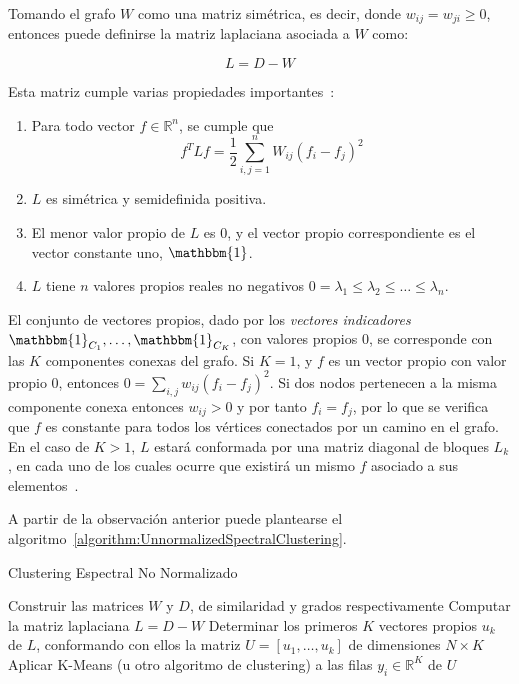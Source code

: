 Tomando el grafo $W$ como una matriz simétrica, es decir, donde $w_{ij}=w_{ji}\geq 0$, entonces puede definirse la matriz laplaciana asociada a $W$ como:

\begin{equation}
    \label{eq:laplacian-graph}
    L = D - W
\end{equation}

Esta matriz cumple varias propiedades importantes~\cite{Luxburg07}:

\begin{enumerate}
    \item Para todo vector $f\in \mathbb{R}^n$, se cumple que
    \[
        f^T Lf = \frac{1}{2}\sum_{i,j=1}^{n}{W_{ij}(f_i - f_j)^2}
    \]
    \item $L$ es simétrica y semidefinida positiva.
    \item El menor valor propio de $L$ es 0, y el vector propio correspondiente es el vector constante uno, $\mathbbm{1}$.
    \item $L$ tiene $n$ valores propios reales no negativos $0=\lambda_1 \leq \lambda_2 \leq \dots \leq \lambda_n$.
\end{enumerate}

El conjunto de vectores propios, dado por los \textit{vectores indicadores} $\mathbbm{1}_{C_1}, \dots, \mathbbm{1}_{C_K}$, con valores propios 0, se corresponde con las $K$ componentes conexas del grafo.
Si $K=1$, y $f$ es un vector propio con valor propio 0, entonces $0=\sum_{i,j}{w_{ij}(f_i - f_j)^2}$.
Si dos nodos pertenecen a la misma componente conexa entonces $w_{ij}>0$ y por tanto $f_i = f_j$, por lo que se verifica que $f$ es constante para todos los vértices conectados por un camino en el grafo.
En el caso de $K>1$, $L$ estará conformada por una matriz diagonal de bloques $L_k$, en cada uno de los cuales ocurre que existirá un mismo $f$ asociado a sus elementos~\cite{Luxburg07,Murphy12}.

A partir de la observación anterior puede plantearse el algoritmo~\ref{algorithm:UnnormalizedSpectralClustering}.

\begin{algorithm}
    \caption{Clustering Espectral No Normalizado}
    \label{algorithm:UnnormalizedSpectralClustering}
    Construir las matrices $W$ y $D$, de similaridad y grados respectivamente\;
    Computar la matriz laplaciana $L = D-W$\;
    Determinar los primeros $K$ vectores propios $u_k$ de $L$, conformando con ellos la matriz $U = [u_1,\dots,u_k]$ de dimensiones $N\times K$\;
    Aplicar K-Means (u otro algoritmo de clustering) a las filas $y_{i}\in \mathbb{R}^K$ de $U$\;
\end{algorithm}

